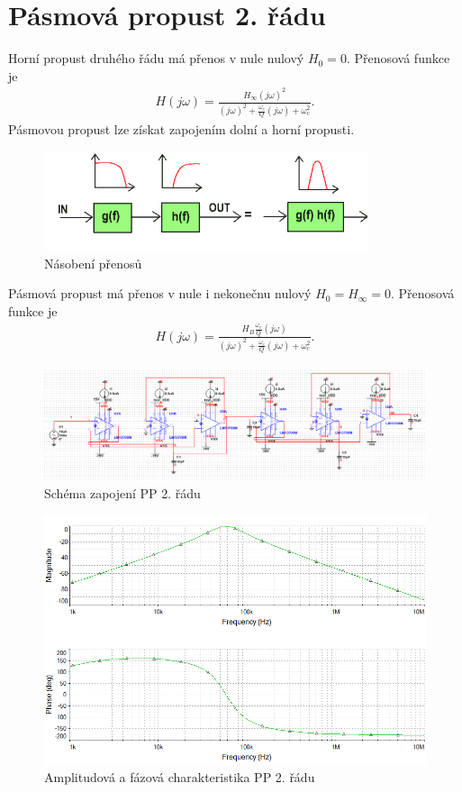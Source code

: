 \documentclass[twoside]{article}
\begin{document}
\section{Pásmová propust 2. řádu}\label{s:PP2}
Horní propust druhého řádu má přenos v nule nulový $H_{0} = 0$. Přenosová funkce je
\begin{align}
H(j\omega) = \frac{H_{\infty} (j\omega) ^2}{(j\omega)^2 + \frac{\omega _c}{Q}(j\omega) + \omega _c ^2}.
\end{align}
\noindent Pásmovou propust lze získat zapojením dolní a horní propusti.
\begin{figure}[H]
\centering
\includegraphics[scale=0.9]{fig9.png}
\caption{Násobení přenosů \cite{9}}
\end{figure}
\noindent Pásmová propust má přenos v nule i nekonečnu nulový $H_{0} = H_{\infty} = 0$. Přenosová funkce je
\begin{align}
H(j\omega) = \frac{H_{B} \frac{\omega _c}{Q} (j\omega) }{(j\omega)^2 + \frac{\omega _c}{Q}(j\omega) + \omega _c ^2}.
\end{align}
\begin{figure}[H]
\centering
\includegraphics[scale=0.6]{PP2O.png}
\caption{Schéma zapojení PP 2. řádu}
\end{figure}
\begin{figure}[H]
\centering
\includegraphics[scale=0.6]{PP2O2.png}
\caption{Amplitudová a fázová charakteristika PP 2. řádu}
\end{figure}
\end{document}
